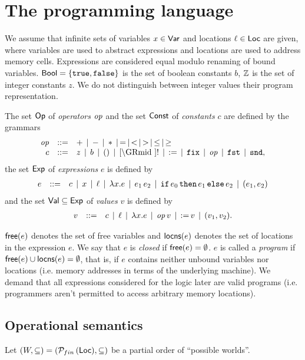 \documentclass[12pt,a4paper]{article}
\begin{document}
\section{The programming language}

We assume that infinite sets of variables $x \in \mathsf{Var}$ and locations $\ell \in \mathsf{Loc}$ are given,
where variables are used to abstract expressions and locations are used to address memory cells.
Expressions are considered equal modulo renaming of bound variables. $\mathsf{Bool}=\{\mathtt{true},\mathtt{false}\}$ is
the set of boolean constants $b$, $\mathbb Z$ is the set of integer constants $z$. We do not distinguish
between integer values their program representation.

\begin{definition}[Expressions]
  The set $\mathsf{Op}$ of {\em operators} $\mathit{op}$ and the set $\mathsf{Const}$ of {\em constants} $c$ are defined by
  the grammars
  \[\GRbeg
  \op \GRis + \GRmid - \GRmid * \GRmid = \GRmid < \GRmid > \GRmid \le \GRmid \ge \\
  c \GRis z \GRmid b \GRmid \unit \GRmid \cref \GRmid ! \GRmid \assign \GRmid \fix \GRmid \op \GRmid \fst \GRmid \snd,
  \GRend\]
  the set $\mathsf{Exp}$ of {\em expressions} $e$ is defined by
  \[\begin{array}{rrlll}
  e & ::= & c \,\mid\, x \,\mid\, \ell \,\mid\, \lambda x.e \,\mid\, e_1\,e_2
  \,\mid\, \mathtt{if}\,e_0\,\mathtt{then}\,e_1\,\mathtt{else}\,e_2 \,\mid\, (e_1,e_2)
  \end{array}\]
  and the set $\mathsf{Val} \subseteq \mathsf{Exp}$ of {\em values} $v$ is defined by
  \[\begin{array}{rrlll}
  v & ::= & c \,\mid\, \ell \,\mid\, \lambda x.e \,\mid\, \mathit{op}\,v \,\mid\, \mathtt{:=}\,v \,\mid\, (v_1,v_2).
  \end{array}\]
\end{definition}

$\mathsf{free}(e)$ denotes the set of free variables and $\mathsf{locns}(e)$ denotes the set of locations in the expression $e$.
We say that $e$ is {\em closed} if $\mathsf{free}(e)=\emptyset$. $e$ is called a {\em program} if
$\mathsf{free}(e)\cup\mathsf{locns}(e)=\emptyset$, that is, if $e$ contains neither unbound variables nor locations (i.e.
memory addresses in terms of the underlying machine). We demand that all expressions considered for the
logic later are valid programs (i.e. programmers aren't permitted to access arbitrary memory locations).


\subsection{Operational semantics}

Let $(W,\subseteq) = (\mathcal{P}_{fin}\,(\mathsf{Loc}),\subseteq)$ be a partial order of ``possible worlds''.
\end{document}
